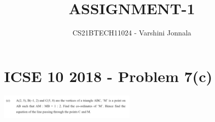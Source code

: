 \documentclass[journal,12pt,twocolumn]{IEEEtran}
\let\vec\mathbf                                %
\begin{document}


\newcommand{\solution}{\noindent \textbf{Solution: }}
\newcommand{\myvec}[1]{\ensuremath{\begin{pmatrix}#1\end{pmatrix}}}
\newcommand{\mydet}[1]{\ensuremath{\begin{vmatrix}#1\end{vmatrix}}}

\let\vec\mathbf

\vspace{3cm}
\title{
   ASSIGNMENT-1
}
\author{CS21BTECH11024 - Varshini  Jonnala}	

\maketitle

\bigskip
\renewcommand{\thefigure}{\theenumi}
\renewcommand{\thetable}{\theenumi}

\section*{ICSE 10 2018 - Problem 7(c)}

\begin{center}
    \includegraphics[width=0.49\textwidth]{prv1a.png}
\end{center}
\end{document}
